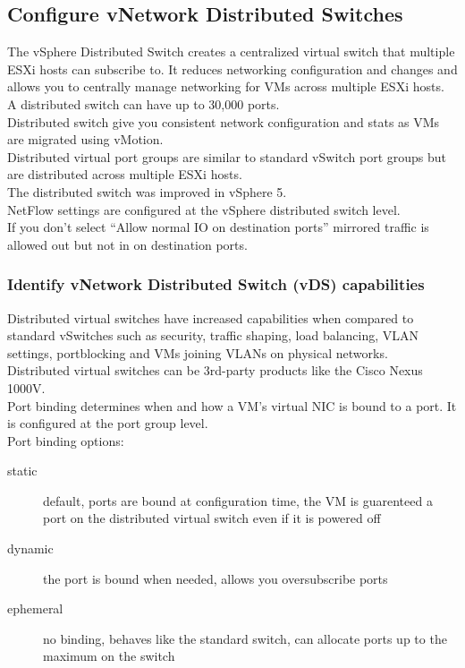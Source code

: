 \subsection{Configure vNetwork Distributed Switches}

The vSphere Distributed Switch creates a centralized virtual switch that
multiple ESXi hosts can subscribe to. It reduces networking configuration and
changes and allows you to centrally manage networking for VMs across multiple
ESXi hosts.\\

A distributed switch can have up to 30,000 ports.\\

Distributed switch give you consistent network configuration and stats as
VMs are migrated using vMotion.\\

Distributed virtual port groups are similar to standard vSwitch port groups
but are distributed across multiple ESXi hosts.\\

The distributed switch was improved in vSphere 5.\\

NetFlow settings are configured at the vSphere distributed switch level.\\

If you don't select ``Allow normal IO on destination ports'' mirrored traffic
is allowed out but not in on destination ports.

\subsubsection{Identify vNetwork Distributed Switch (vDS) capabilities}

Distributed virtual switches have increased capabilities when compared to
standard vSwitches such as security, traffic shaping, load balancing, VLAN
settings, portblocking and VMs joining VLANs on physical networks.\\

Distributed virtual switches can be 3rd-party products like the Cisco Nexus
1000V.\\

Port binding determines when and how a VM's virtual NIC is bound to a port.
It is configured at the port group level.\\

Port binding options:

\begin{description}

\item[static]
default, ports are bound at configuration time, the VM is guarenteed a port
on the distributed virtual switch even if it is powered off

\item[dynamic]
the port is bound when needed, allows you oversubscribe ports

\item[ephemeral]
no binding, behaves like the standard switch, can allocate ports up to the
maximum on the switch

\end{description}

